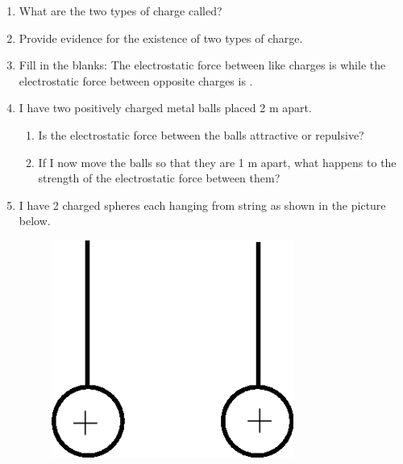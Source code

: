       
      \label{m38781*id202059}\begin{enumerate}[noitemsep, label=\textbf{\arabic*}. ] 
            \label{m38781*uid21}\item What are the two types of charge called?\newline
            
\label{m38781*uid22}\item Provide evidence for the existence of two types of charge.\newline
            
\label{m38781*uid23}\item Fill in the blanks: The electrostatic force between like charges is  \uline{\hspace{10ex}}
 while the electrostatic force between opposite charges is  \uline{\hspace{10ex}}
.\newline
            
\label{m38781*uid24}\item I have two positively charged metal balls placed 2 m apart.
\label{m38781*id202122}\begin{enumerate}[noitemsep, label=\textbf{\alph*}. ] 
            \label{m38781*uid25}\item Is the electrostatic force between the balls attractive or repulsive?
\label{m38781*uid26}\item If I now move the balls so that they are 1 m apart, what happens to the strength of the electrostatic force between them?
\end{enumerate}
        \newline
            \label{m38781*uid27}\item I have 2 charged spheres each hanging from string as shown in the picture below.

    \setcounter{subfigure}{0}


	\begin{figure}[H] %
    \begin{center}
    \label{m38781*id202166!!!underscore!!!media}\label{m38781*id202166!!!underscore!!!printimage}\includegraphics[width=300px]{col11305.imgs/m38781_PG10C8_012.png} %
        

\end{center}
\end{figure}
\end{enumerate}
